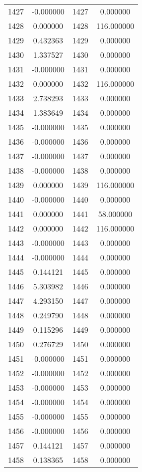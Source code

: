 \documentclass[12pt]{article}
\begin{document}
\begin{longtable}{@{}cccc@{}}
1427 & -0.000000 & 1427 & 0.000000 \\
1428 & 0.000000 & 1428 & 116.000000 \\
1429 & 0.432363 & 1429 & 0.000000 \\
1430 & 1.337527 & 1430 & 0.000000 \\
1431 & -0.000000 & 1431 & 0.000000 \\
1432 & 0.000000 & 1432 & 116.000000 \\
1433 & 2.738293 & 1433 & 0.000000 \\
1434 & 1.383649 & 1434 & 0.000000 \\
1435 & -0.000000 & 1435 & 0.000000 \\
1436 & -0.000000 & 1436 & 0.000000 \\
1437 & -0.000000 & 1437 & 0.000000 \\
1438 & -0.000000 & 1438 & 0.000000 \\
1439 & 0.000000 & 1439 & 116.000000 \\
1440 & -0.000000 & 1440 & 0.000000 \\
1441 & 0.000000 & 1441 & 58.000000 \\
1442 & 0.000000 & 1442 & 116.000000 \\
1443 & -0.000000 & 1443 & 0.000000 \\
1444 & -0.000000 & 1444 & 0.000000 \\
1445 & 0.144121 & 1445 & 0.000000 \\
1446 & 5.303982 & 1446 & 0.000000 \\
1447 & 4.293150 & 1447 & 0.000000 \\
1448 & 0.249790 & 1448 & 0.000000 \\
1449 & 0.115296 & 1449 & 0.000000 \\
1450 & 0.276729 & 1450 & 0.000000 \\
1451 & -0.000000 & 1451 & 0.000000 \\
1452 & -0.000000 & 1452 & 0.000000 \\
1453 & -0.000000 & 1453 & 0.000000 \\
1454 & -0.000000 & 1454 & 0.000000 \\
1455 & -0.000000 & 1455 & 0.000000 \\
1456 & -0.000000 & 1456 & 0.000000 \\
1457 & 0.144121 & 1457 & 0.000000 \\
1458 & 0.138365 & 1458 & 0.000000 \\

\end{longtable}
\end{document}
